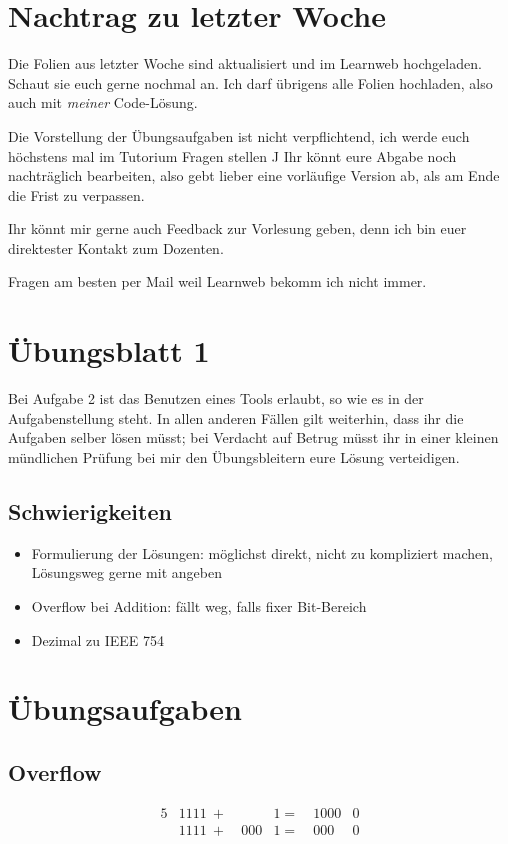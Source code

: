 \documentclass{article}
\begin{document}
\section{Nachtrag zu letzter Woche}
Die Folien aus letzter Woche sind aktualisiert und im Learnweb hochgeladen. Schaut sie euch gerne nochmal an. Ich darf übrigens alle Folien hochladen, also auch mit \textit{meiner} Code-Lösung.

Die Vorstellung der Übungsaufgaben ist nicht verpflichtend, ich werde euch höchstens mal im Tutorium Fragen stellen ^^

Ihr könnt eure Abgabe noch nachträglich bearbeiten, also gebt lieber eine vorläufige Version ab, als am Ende die Frist zu verpassen.

Ihr könnt mir gerne auch Feedback zur Vorlesung geben, denn ich bin euer direktester Kontakt zum Dozenten.

Fragen am besten per Mail weil Learnweb bekomm ich nicht immer.

\section{Übungsblatt 1}
Bei Aufgabe 2 ist das Benutzen eines Tools erlaubt, so wie es in der Aufgabenstellung steht. In allen anderen Fällen gilt weiterhin, dass ihr die Aufgaben selber lösen müsst; bei Verdacht auf Betrug müsst ihr in einer kleinen mündlichen Prüfung bei mir den Übungsbleitern eure Lösung verteidigen.

\subsection{Schwierigkeiten}
\begin{itemize}
    \item Formulierung der Lösungen: möglichst direkt, nicht zu kompliziert machen, Lösungsweg gerne mit angeben
    \item Overflow bei Addition: fällt weg, falls fixer Bit-Bereich
    \item Dezimal zu IEEE 754
\end{itemize}

\section{Übungsaufgaben}
\subsection{Overflow}
\begin{alignat*}{5}
    &1111\ +&\    &1 =&\ 1000&0\\
    &1111\ +&\ 000&1 =&\  000&0
\end{alignat*}
\end{document}
